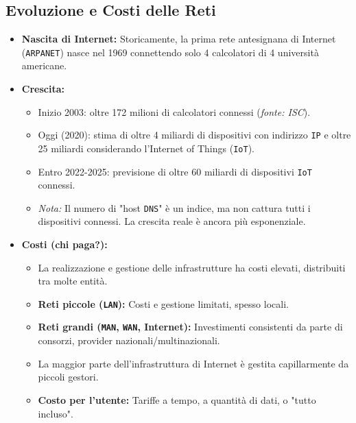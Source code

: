 \subsection{Evoluzione e Costi delle Reti}
\begin{itemize}
    \item \textbf{Nascita di Internet:} Storicamente, la prima rete antesignana di Internet (\texttt{ARPANET}) nasce nel 1969 connettendo solo 4 calcolatori di 4 università americane.
    \item \textbf{Crescita:}
    \begin{itemize}
        \item Inizio 2003: oltre 172 milioni di calcolatori connessi (\textit{fonte: ISC}).
        \item Oggi (2020): stima di oltre 4 miliardi di dispositivi con indirizzo \texttt{IP} e oltre 25 miliardi considerando l'Internet of Things (\texttt{IoT}).
        \item Entro 2022-2025: previsione di oltre 60 miliardi di dispositivi \texttt{IoT} connessi.
        \item \textit{Nota:} Il numero di "host \texttt{DNS}" è un indice, ma non cattura tutti i dispositivi connessi. La crescita reale è ancora più esponenziale.
    \end{itemize}
    \item \textbf{Costi (chi paga?):}
    \begin{itemize}
        \item La realizzazione e gestione delle infrastrutture ha costi elevati, distribuiti tra molte entità.
        \item \textbf{Reti piccole (\texttt{LAN}):} Costi e gestione limitati, spesso locali.
        \item \textbf{Reti grandi (\texttt{MAN}, \texttt{WAN}, Internet):} Investimenti consistenti da parte di consorzi, provider nazionali/multinazionali.
        \item La maggior parte dell'infrastruttura di Internet è gestita capillarmente da piccoli gestori.
        \item \textbf{Costo per l'utente:} Tariffe a tempo, a quantità di dati, o "tutto incluso".
    \end{itemize}
\end{itemize}

